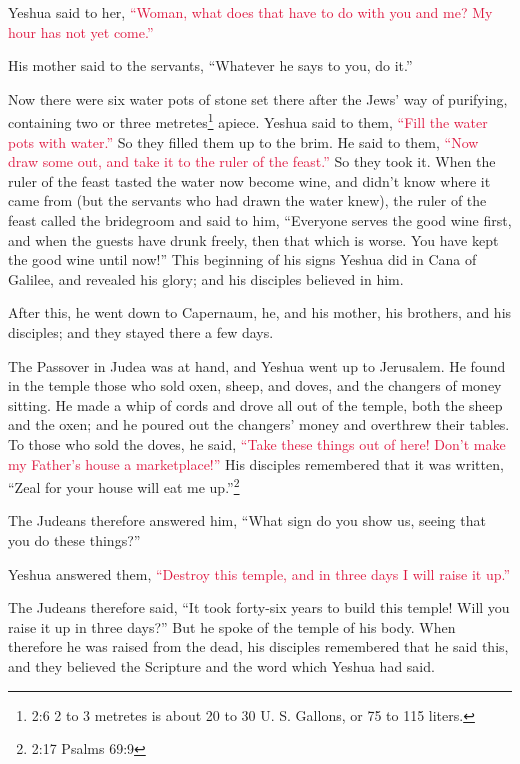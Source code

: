\myverse{}Yeshua said to her,
\textcolor{crimson}{“Woman, what does that have to do with you and me? My hour has not yet come.”}

\myverse{}His mother said to the servants, “Whatever he says to you, do it.”

\myverse{}Now there were six water pots of stone set there after the Jews’
way of purifying, containing two or three metretes\footnote{2:6 2 to 3 metretes is about 20 to 30 U. S. Gallons, or 75 to 115 liters.} apiece.
\myverse{}Yeshua said to them,
\textcolor{crimson}{“Fill the water pots with water.”} So they filled them up to the brim.
\myverse{}He said to them,
\textcolor{crimson}{“Now draw some out, and take it to the ruler of the feast.”} So they took it.
\myverse{}When the ruler of the feast tasted the water now become wine, and didn’t know
where it came from (but the servants who had drawn the water knew), the ruler of the feast called the
bridegroom
\myverse{}and said to him, “Everyone serves the good wine first, and when the guests
have drunk freely, then that which is worse. You have kept the good wine until now!”
\myverse{}This beginning of his signs Yeshua did in Cana of Galilee, and revealed his
glory; and his disciples believed in him.

\myverse{}After this, he went down to Capernaum, he, and his mother, his
brothers, and his disciples; and they stayed there a few days.

\myverse{}The Passover in Judea was at hand, and Yeshua went up to Jerusalem.
\myverse{}He found in the temple those who sold oxen, sheep, and doves, and the changers
of money sitting.
\myverse{}He made a whip of cords and drove all out of the temple, both the sheep and
the oxen; and he poured out the changers’ money and overthrew their tables.
\myverse{}To those who sold the doves, he said,
\textcolor{crimson}{“Take these things out of here! Don’t make my Father’s house a marketplace!”}
\myverse{}His disciples remembered that it was written, “Zeal for your house will eat
me up.”\footnote{2:17 Psalms 69:9}

\myverse{}The Judeans therefore answered him, “What sign do you show us,
seeing that you do these things?”

\myverse{}Yeshua answered them,
\textcolor{crimson}{“Destroy this temple, and in three days I will raise it up.”}

\myverse{}The Judeans therefore said, “It took forty-six years to build
this temple! Will you raise it up in three days?”
\myverse{}But he spoke of the temple of his body.
\myverse{}When therefore he was raised from the dead, his disciples remembered that
he said this, and they believed the Scripture and the word which Yeshua had said.

